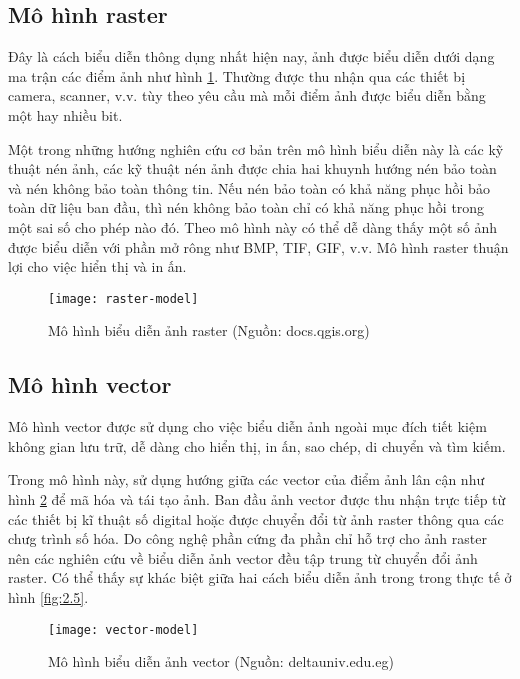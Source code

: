 \subsection{Mô hình raster}
Đây là cách biểu diễn thông dụng nhất hiện nay, ảnh được biểu diễn dưới dạng ma trận các điểm ảnh như hình \ref{fig:2.3}. Thường được thu nhận qua các thiết bị camera, scanner, v.v. tùy theo yêu cầu mà mỗi điểm ảnh được biểu diễn bằng một hay nhiều bit.\par
Một trong những hướng nghiên cứu cơ bản trên mô hình biểu diễn này là các kỹ thuật nén ảnh, các kỹ thuật nén ảnh được chia hai khuynh hướng nén bảo toàn và nén không bảo toàn thông tin. Nếu nén bảo toàn có khả năng phục hồi bảo toàn dữ liệu ban đầu, thì nén không bảo toàn chỉ có khả năng phục hồi trong một sai số cho phép nào đó. Theo mô hình này có thể dễ dàng thấy một số ảnh được biểu diễn với phần mở rông như BMP, TIF, GIF, v.v. Mô hình raster thuận lợi cho việc hiển thị và in ấn.

\begin{figure}[h]
	\centering
	\texttt{[image: raster-model]}
	\caption[Mô hình biểu diễn ảnh raster]{Mô hình biểu diễn ảnh raster (Nguồn: docs.qgis.org)}
	\label{fig:2.3}
\end{figure}

\subsection{Mô hình vector}
Mô hình vector được sử dụng cho việc biểu diễn ảnh ngoài mục đích tiết kiệm không gian lưu trữ, dễ dàng cho hiển thị, in ấn, sao chép, di chuyển và tìm kiếm.\par

Trong mô hình này, sử dụng hướng giữa các vector của điểm ảnh lân cận như hình \ref{fig:2.4} để mã hóa và tái tạo ảnh. Ban đầu ảnh vector được thu nhận trực tiếp từ các thiết bị kĩ thuật số digital hoặc được chuyển đổi từ ảnh raster thông qua các chưg trình số hóa. Do công nghệ phần cứng đa phần chỉ hỗ trợ cho ảnh raster nên các nghiên cứu về biểu diễn ảnh vector đều tập trung từ chuyển đổi ảnh raster. Có thể thấy sự khác biệt giữa hai cách biểu diễn ảnh trong trong thực tế ở hình \ref{fig:2.5}.\par

\begin{figure}[h]
	\centering
	\texttt{[image: vector-model]}
	\caption[Mô hình biểu diễn ảnh vector]{Mô hình biểu diễn ảnh vector (Nguồn: deltauniv.edu.eg)}
	\label{fig:2.4}
\end{figure}


